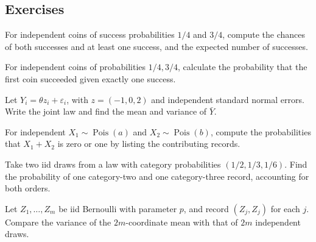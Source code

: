 \documentclass[11pt,oneside]{book}
\theoremstyle{definition}
\theoremstyle{remark}
\begin{document}
\subsection{Exercises}
\label{subsec:worked-examples-1-2}

\begin{practiceexercise}
\label{wex:different-coins}
For independent coins of success probabilities $1/4$ and $3/4$, compute the
chances of both successes and at least one success, and the expected number
of successes.
\end{practiceexercise}

\begin{practiceexercise}
\label{wex:unequal-coins-given-count}
For independent coins of probabilities $1/4,3/4$, calculate the probability
that the first coin succeeded given exactly one success.
\end{practiceexercise}

\begin{practiceexercise}
\label{wex:fixed-design-average}
Let $Y_i=\theta z_i+\varepsilon_i$, with $z=(-1,0,2)$ and independent
standard normal errors. Write the joint law and find the mean and variance
of $\bar Y$.
\end{practiceexercise}

\begin{practiceexercise}
\label{wex:poisson-zero-or-one}
For independent $X_1\sim\operatorname{Pois}(a)$ and
$X_2\sim\operatorname{Pois}(b)$, compute the probabilities that $X_1+X_2$ is
zero or one by listing the contributing records.
\end{practiceexercise}

\begin{practiceexercise}
\label{wex:categorical-two-hits}
Take two iid draws from a law with category probabilities
$(1/2,1/3,1/6)$. Find the probability of one category-two and one
category-three record, accounting for both orders.
\end{practiceexercise}

\begin{practiceexercise}
\label{wex:clustered-copies}
Let $Z_1,\ldots,Z_m$ be iid Bernoulli with parameter $p$, and record
$(Z_j,Z_j)$ for each $j$. Compare the variance of the $2m$-coordinate mean
with that of $2m$ independent draws.
\end{practiceexercise}
\end{document}
